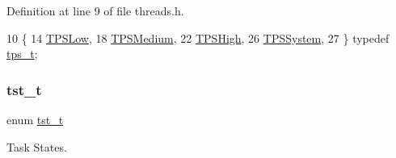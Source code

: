 Definition at line 9 of file threads.\+h.


\begin{DoxyCode}
10  \{
14     \hyperlink{a00044_a5ee504524d7b79ed81a1ed7b325dc9c6_a5ee504524d7b79ed81a1ed7b325dc9c6a9d68d2bd5bb4b7a813b53a3c6efb26a3}{TPSLow},
18     \hyperlink{a00044_a5ee504524d7b79ed81a1ed7b325dc9c6_a5ee504524d7b79ed81a1ed7b325dc9c6ab65c1c2b03accd655caa87db240a87db}{TPSMedium},
22     \hyperlink{a00044_a5ee504524d7b79ed81a1ed7b325dc9c6_a5ee504524d7b79ed81a1ed7b325dc9c6a99b1e5d2af2ea961d67a5d0f982fb0c2}{TPSHigh},
26     \hyperlink{a00044_a5ee504524d7b79ed81a1ed7b325dc9c6_a5ee504524d7b79ed81a1ed7b325dc9c6a557f7fd60ef979a8df84e7eea7de9f9b}{TPSSystem},
27 \} \textcolor{keyword}{typedef} \hyperlink{a00044_a5ee504524d7b79ed81a1ed7b325dc9c6_a5ee504524d7b79ed81a1ed7b325dc9c6}{tps\_t};
\end{DoxyCode}
\mbox{\label{a00044_a3895f03bb811310833570ff0b8a403d9_a3895f03bb811310833570ff0b8a403d9}} 
\subsubsection{\texorpdfstring{tst\+\_\+t}{tst\_t}}
{\footnotesize\ttfamily enum \hyperlink{a00044_a3895f03bb811310833570ff0b8a403d9_a3895f03bb811310833570ff0b8a403d9}{tst\+\_\+t}}



Task States. 

